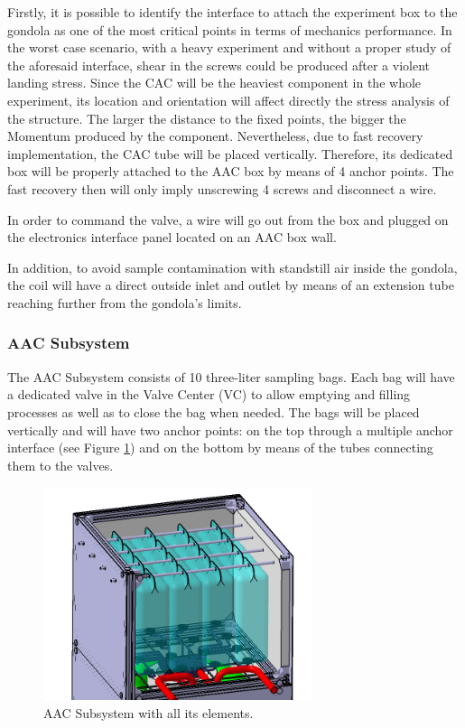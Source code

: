 \smallskip
Firstly, it is possible to identify the interface to attach the experiment box to the gondola as one of the most critical points in terms of mechanics performance. In the worst case scenario, with a heavy experiment and without a proper study of the aforesaid interface, shear in the screws could be produced after a violent landing stress. Since the CAC will be the heaviest component in the whole experiment, its location and orientation will affect directly the stress analysis of the structure. The larger the distance to the fixed points, the bigger the Momentum produced by the component. Nevertheless, due to fast recovery implementation, the CAC tube will be placed vertically. Therefore, its dedicated box will be properly attached to the AAC box by means of 4 anchor points. The fast recovery then will only imply unscrewing 4 screws and disconnect a wire. 

\smallskip
In order to command the valve, a wire will go out from the box and plugged on the electronics interface panel located on an AAC box wall.

\smallskip
In addition, to avoid sample contamination with standstill air inside the gondola, the coil will have a direct outside inlet and outlet by means of an extension tube reaching further from the gondola’s limits.


\pagebreak
\subsubsection{AAC Subsystem}

The AAC Subsystem consists of 10 three-liter sampling bags. Each bag will have a dedicated valve in the Valve Center (VC) to allow emptying and filling processes as well as to close the bag when needed. The bags will be placed vertically and will have two anchor points: on the top through a  multiple anchor interface (see Figure \ref{anchor_bags}) and on the bottom by means of the tubes connecting them to the valves.


\begin{figure}[!ht]
    \centering
    \includegraphics[width=0.7\textwidth]{4-experiment-design/img/anchored_bags.jpg}
    \caption{AAC Subsystem with all its elements.}
    \label{anchor_bags}
\end{figure}

